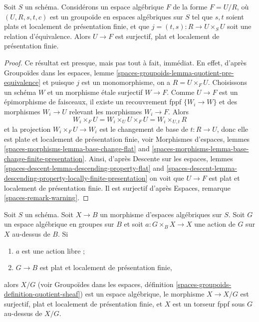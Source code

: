\begin{lemma}
\label{lemma-covering-quotient}
Soit $S$ un schéma. Considérons un espace algébrique $F$ de la forme $F = U/R$,
où $(U, R, s, t, c)$ est un groupoïde en espaces algébriques
sur $S$ tel que $s, t$ soient plats et localement de présentation finie, et que
$j = (t, s) : R \to U \times_S U$ soit une relation d'équivalence.
Alors $U \to F$ est surjectif, plat et localement de présentation finie.
\end{lemma}

\begin{proof}
Ce résultat est presque, mais pas tout à fait, immédiat. En effet, d'après
Groupoïdes dans les espaces, lemme
\ref{spaces-groupoids-lemma-quotient-pre-equivalence}
et puisque $j$ est un monomorphisme, on a $R = U \times_F U$.
Choisissons un schéma $W$ et un morphisme étale surjectif $W \to F$.
Comme $U \to F$ est un épimorphisme de faisceaux, il existe un recouvrement fppf
$\{W_i \to W\}$ et des morphismes $W_i \to U$ relevant les morphismes $W_i \to F$.
Alors
$$
W_i \times_F U = W_i \times_U U \times_F U = W_i \times_{U, t} R
$$
et la projection $W_i \times_F U \to W_i$ est le changement de base de
$t : R \to U$, donc elle est plate et localement de présentation finie, voir
Morphismes d'espaces, lemmes
\ref{spaces-morphisms-lemma-base-change-flat} and
\ref{spaces-morphisms-lemma-base-change-finite-presentation}.
Ainsi, d'après
Descente sur les espaces, lemmes
\ref{spaces-descent-lemma-descending-property-flat} and
\ref{spaces-descent-lemma-descending-property-locally-finite-presentation}
on voit que $U \to F$ est plat et localement de présentation finie.
Il est surjectif d'après
Espaces, remarque \ref{spaces-remark-warning}.
\end{proof}

\begin{lemma}
\label{lemma-quotient-free-action}
Soit $S$ un schéma. Soit $X \to B$ un morphisme d'espaces algébriques sur
$S$. Soit $G$ un espace algébrique en groupes sur $B$ et soit
$a : G \times_B X \to X$ une action de $G$ sur $X$ au-dessus de $B$.
Si
\begin{enumerate}
\item $a$ est une action libre ;
\item $G \to B$ est plat et localement de présentation finie,
\end{enumerate}
alors $X/G$ (voir
Groupoïdes dans les espaces, définition
\ref{spaces-groupoids-definition-quotient-sheaf})
est un espace algébrique, le morphisme $X \to X/G$ est
surjectif, plat et localement de présentation finie, et
$X$ est un torseur fppf sous $G$ au-dessus de $X/G$.
\end{lemma}

